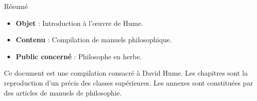 \begin{center}
\Large
Résumé
\normalsize
\end{center}
\vspace{3cm}
\begin{itemize}[leftmargin=1cm, label=, itemsep=21pt]
\item {\bf Objet}  : Introduction à l'œuvre de Hume.
\item {\bf Contenu}  : Compilation de manuels philosophique.
\item {\bf Public concerné} : Philosophe en herbe.
\end{itemize}

\vspace{3cm}

Ce document est une compilation consacré à David Hume. Les chapitres sont la reproduction d'un précis des classes supérieures. Les annexes sont constituées par des articles de manuels de philosophie.

\vspace{3cm}

